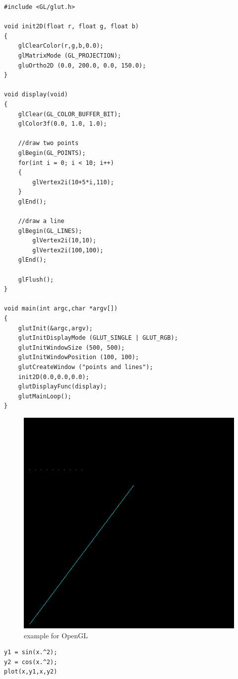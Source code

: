 \begin{lstlisting}
#include <GL/glut.h>

void init2D(float r, float g, float b)
{
	glClearColor(r,g,b,0.0);  
	glMatrixMode (GL_PROJECTION);
	gluOrtho2D (0.0, 200.0, 0.0, 150.0);
}

void display(void)
{
	glClear(GL_COLOR_BUFFER_BIT);
	glColor3f(0.0, 1.0, 1.0);

	//draw two points
	glBegin(GL_POINTS);
	for(int i = 0; i < 10; i++)
	{
		glVertex2i(10+5*i,110);
	}
	glEnd();

	//draw a line
	glBegin(GL_LINES);
		glVertex2i(10,10);
		glVertex2i(100,100);
	glEnd();

	glFlush();
}

void main(int argc,char *argv[])
{
	glutInit(&argc,argv);
	glutInitDisplayMode (GLUT_SINGLE | GLUT_RGB);
	glutInitWindowSize (500, 500);
	glutInitWindowPosition (100, 100);
	glutCreateWindow ("points and lines");
	init2D(0.0,0.0,0.0);
	glutDisplayFunc(display);
	glutMainLoop();
}
\end{lstlisting}
\begin{figure}

\includegraphics[scale=0.5]{abc}
\caption{example for OpenGL}
\end{figure}

\begin{lstlisting}
y1 = sin(x.^2);
y2 = cos(x.^2);
plot(x,y1,x,y2)
\end{lstlisting}


